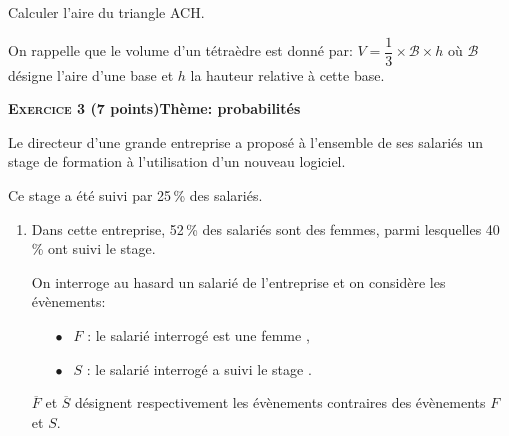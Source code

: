 \documentclass[11pt,a4paper,french]{article}
\begin{document}
\begin{enumerate}
Calculer l'aire du triangle ACH.

On rappelle que le volume d'un tétraèdre est donné par: $V = \dfrac13 \times \mathcal{B} \times h$ où $\mathcal{B}$ désigne l'aire d'une base et $h$ la hauteur relative à cette base.
\end{enumerate}

\bigskip

\textbf{\textsc{Exercice 3} \quad (7 points)\hfill  Thème: probabilités}

\medskip

Le directeur d'une grande entreprise a proposé à l'ensemble de ses salariés un stage de formation à l'utilisation d'un nouveau logiciel.

Ce stage a été suivi par 25\,\% des salariés.

\medskip

\begin{enumerate}
\item Dans cette entreprise, 52\,\% des salariés sont des femmes, parmi lesquelles 
40\,\% ont suivi le stage.

On interroge au hasard un salarié de l'entreprise et on considère les évènements:

\setlength\parindent{1cm}
\begin{itemize}
\item[$\bullet~~$] $F$ : \og le salarié interrogé est une femme \fg,
\item[$\bullet~~$] $S$ : \og le salarié interrogé a suivi le stage \fg.
\end{itemize}
\setlength\parindent{0cm}

$\overline{F}$ et $\overline{S}$ désignent respectivement les évènements contraires des évènements $F$ et $S$.
\end{enumerate}
\end{document}
